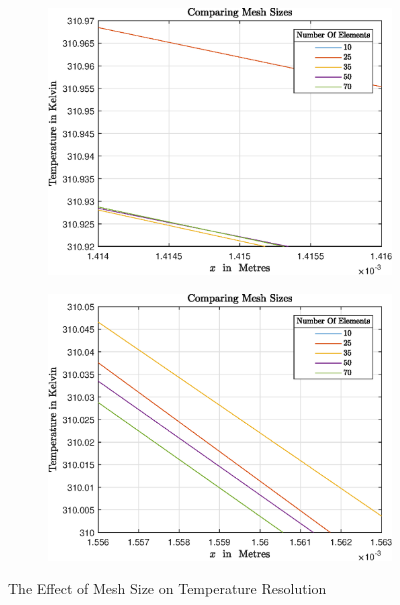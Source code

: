 \documentclass[11pt]{article}
\begin{document}
\begin{figure}[ht] 
        \centering
        \begin{subfigure}[b]{0.475\textwidth}
            \centering
            \includegraphics[width=\textwidth]{epsMesh11}
            \caption[Network2]%
            {{\small  }}    
            \label{fig:zoommesh1}
        \end{subfigure}
        \hfill
        \begin{subfigure}[b]{0.475\textwidth}  
            \centering 
            \includegraphics[width=\textwidth]{epsMesh12}
            \caption[]%
            {{\small }}    
            \label{fig:zoommesh2}
        \end{subfigure}
        \caption[ The Effect of Mesh Size on Temperature Resolution ]
        {\small The Effect of Mesh Size on Temperature Resolution} 
        \label{fig:meshzoom}
    \end{figure}
\end{document}
